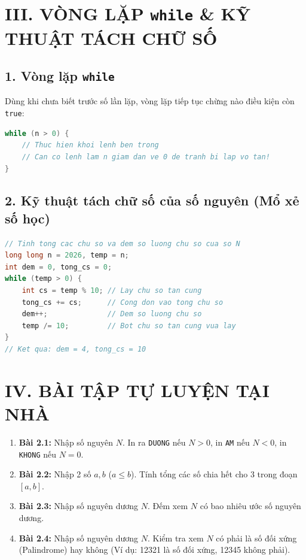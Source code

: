 \documentclass[11pt,a4paper]{article}
\begin{document}
\section*{\color{AsianDarkBlue}III. VÒNG LẶP \texttt{while} \& KỸ THUẬT TÁCH CHỮ SỐ}

\subsection*{\color{AsianBlue}1. Vòng lặp \texttt{while}}
Dùng khi chưa biết trước số lần lặp, vòng lặp tiếp tục chừng nào điều kiện còn \texttt{true}:
\begin{lstlisting}[language=C++]
while (n > 0) {
    // Thuc hien khoi lenh ben trong
    // Can co lenh lam n giam dan ve 0 de tranh bi lap vo tan!
}
\end{lstlisting}

\subsection*{\color{AsianBlue}2. Kỹ thuật tách chữ số của số nguyên (Mổ xẻ số học)}
\begin{lstlisting}[language=C++]
// Tinh tong cac chu so va dem so luong chu so cua so N
long long n = 2026, temp = n;
int dem = 0, tong_cs = 0;
while (temp > 0) {
    int cs = temp % 10; // Lay chu so tan cung
    tong_cs += cs;      // Cong don vao tong chu so
    dem++;              // Dem so luong chu so
    temp /= 10;         // Bot chu so tan cung vua lay
}
// Ket qua: dem = 4, tong_cs = 10
\end{lstlisting}

\section*{\color{AsianDarkBlue}IV. BÀI TẬP TỰ LUYỆN TẠI NHÀ}
\begin{enumerate}
    \setlength{\itemsep}{2pt}
    \small
    \item \textbf{Bài 2.1:} Nhập số nguyên $N$. In ra \texttt{DUONG} nếu $N > 0$, in \texttt{AM} nếu $N < 0$, in \texttt{KHONG} nếu $N = 0$.
    \item \textbf{Bài 2.2:} Nhập 2 số $a, b$ ($a \le b$). Tính tổng các số chia hết cho 3 trong đoạn $[a, b]$.
    \item \textbf{Bài 2.3:} Nhập số nguyên dương $N$. Đếm xem $N$ có bao nhiêu ước số nguyên dương.
    \item \textbf{Bài 2.4:} Nhập số nguyên dương $N$. Kiểm tra xem $N$ có phải là số đối xứng (Palindrome) hay không (Ví dụ: 12321 là số đối xứng, 12345 không phải).
\end{enumerate}
\end{document}
